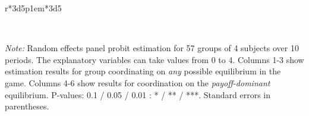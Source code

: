 \documentclass[11pt,a4paper]{article}
\begin{document}
\begin{refsection}
\begin{table}[tbp]
{\begin{tabular}{r*{3}{d{5}}p{1em}*{3}{d{5}}}
\bottomrule
\end{tabular}
}
  \label{tab:equiWPS}
  \smallskip\\
  \parbox{\linewidth}{\footnotesize\textit{Note:} Random effects panel probit
    estimation for 57 groups of 4 subjects over 10 periods. The explanatory
    variables can take values from 0 to 4. Columns 1-3 show estimation results
    for group coordinating on \emph{any} possible equilibrium in the game.
    Columns 4-6 show results for coordination on the \emph{payoff-dominant}
    equilibrium. P-values: 0.1 / 0.05 / 0.01 : * / ** / ***. Standard errors in parentheses.
    }
\end{table}

\clearpage
\printbibliography
\end{refsection}


\newpage
\appendix
{}
\end{document}
